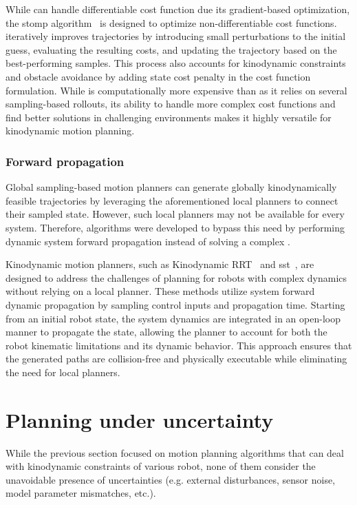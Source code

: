 While  can handle differentiable cost function due its gradient-based optimization, the \gls{stomp} algorithm~\cite{cSTOMP} is designed to optimize non-differentiable cost functions. 
 iteratively improves trajectories by introducing small perturbations to the initial guess, evaluating the resulting costs, and updating the trajectory based on the best-performing samples. 
This process also accounts for kinodynamic constraints and obstacle avoidance by adding state cost penalty in the cost function formulation.
While  is computationally more expensive than  as it relies on several sampling-based rollouts, its ability to handle more complex cost functions and find better solutions in challenging environments makes it highly versatile for kinodynamic motion planning.

\subsubsection{Forward propagation}\label{sec:forwardplanning}

Global sampling-based motion planners can generate globally kinodynamically feasible trajectories by leveraging the aforementioned local planners to connect their sampled state.
However, such local planners may not be available for every system.
Therefore, algorithms were developed to bypass this need by performing dynamic system forward propagation instead of solving a complex .

Kinodynamic motion planners, such as Kinodynamic RRT~\cite{cKinoRRT} and \gls{sst}~\cite{cSST}, are designed to address the challenges of planning for robots with complex dynamics without relying on a local planner. 
These methods utilize system forward dynamic propagation by sampling control inputs and propagation time. 
Starting from an initial robot state, the system dynamics are integrated in an open-loop manner to propagate the state, allowing the planner to account for both the robot kinematic limitations and its dynamic behavior. 
This approach ensures that the generated paths are collision-free and physically executable while eliminating the need for local planners.

\section{Planning under uncertainty}\label{sec:planuncertainty}

While the previous section focused on motion planning algorithms that can deal with kinodynamic constraints of various robot, none of them consider the unavoidable presence of uncertainties (e.g. external disturbances, sensor noise, model parameter mismatches, etc.).

